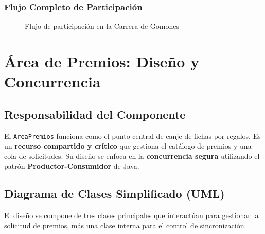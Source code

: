 \documentclass[12pt,a4paper]{article}
\begin{document}
\subsubsection{Flujo Completo de Participación}

\begin{figure}[H]
\centering
{}
\caption{Flujo de participación en la Carrera de Gomones}
\end{figure}


\newpage
\section{Área de Premios: Diseño y Concurrencia}

\subsection{Responsabilidad del Componente}

El \texttt{AreaPremios} funciona como el punto central de canje de fichas por regalos. Es un \textbf{recurso compartido y crítico} que gestiona el catálogo de premios y una cola de solicitudes. Su diseño se enfoca en la \textbf{concurrencia segura} utilizando el patrón \textbf{Productor-Consumidor} de Java.



\subsection{Diagrama de Clases Simplificado (UML)}


El diseño se compone de tres clases principales que interactúan para gestionar la solicitud de premios, más una clase interna para el control de sincronización.
\end{document}
